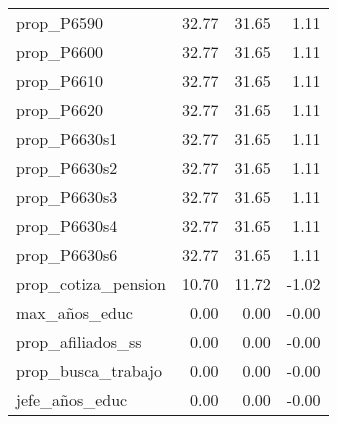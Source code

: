 \begin{table}[H]
\begin{tabular}{lrrr}
  prop\_P6590 & 32.77 & 31.65 & 1.11 \\ 
  prop\_P6600 & 32.77 & 31.65 & 1.11 \\ 
  prop\_P6610 & 32.77 & 31.65 & 1.11 \\ 
  prop\_P6620 & 32.77 & 31.65 & 1.11 \\ 
  prop\_P6630s1 & 32.77 & 31.65 & 1.11 \\ 
  prop\_P6630s2 & 32.77 & 31.65 & 1.11 \\ 
  prop\_P6630s3 & 32.77 & 31.65 & 1.11 \\ 
  prop\_P6630s4 & 32.77 & 31.65 & 1.11 \\ 
  prop\_P6630s6 & 32.77 & 31.65 & 1.11 \\ 
  prop\_cotiza\_pension & 10.70 & 11.72 & -1.02 \\ 
  max\_años\_educ & 0.00 & 0.00 & -0.00 \\ 
  prop\_afiliados\_ss & 0.00 & 0.00 & -0.00 \\ 
  prop\_busca\_trabajo & 0.00 & 0.00 & -0.00 \\ 
  jefe\_años\_educ & 0.00 & 0.00 & -0.00 \\ 
\bottomrule
\end{tabular}
\end{table}